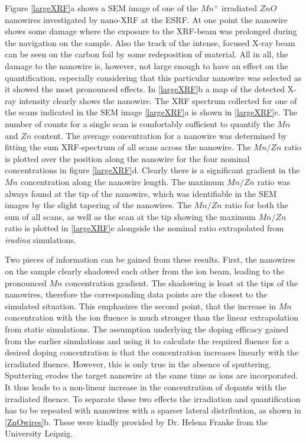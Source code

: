 Figure \ref{largeXRF}a shows a SEM image of one of the $Mn^+$ irradiated $ZnO$ nanowires investigated by nano-XRF at the ESRF. At one point the nanowire shows some damage where the exposure to the XRF-beam was prolonged during the navigation on the sample. Also the track of the intense, focused X-ray beam can be seen on the carbon foil by some redeposition of material. All in all, the damage to the nanowire is, however, not large enough to have an effect on the quantification, especially considering that this particular nanowire was selected as it showed the most pronounced effects. In \ref{largeXRF}b a map of the detected X-ray intensity clearly shows the nanowire. The XRF spectrum collected for one of the scans indicated in the SEM image \ref{largeXRF}a is shown in \ref{largeXRF}c. The number of counts for a single scan is comfortably sufficient to quantify the $Mn$ and $Zn$ content. The average concentration for a nanowire was determined by fitting the sum XRF-spectrum of all scans across the nanowire. The $Mn/Zn$ ratio is plotted over the position along the nanowire for the four nominal concentrations in figure \ref{largeXRF}d. Clearly there is a significant gradient in the $Mn$ concentration along the nanowire length. The maximum $Mn/Zn$ ratio was always found at the tip of the nanowire, which was identifiable in the SEM images by the slight tapering of the nanowires. The $Mn/Zn$ ratio for both the sum of all scans, as well as the scan at the tip showing the maximum $Mn/Zn$ ratio is plotted in \ref{largeXRF}e alongside the nominal ratio extrapolated from \emph{iradina} simulations.
  
Two pieces of information can be gained from these results. First, the nanowires on the sample clearly shadowed each other from the ion beam, leading to the pronounced $Mn$ concentration gradient. The shadowing is least at the tips of the nanowires, therefore the corresponding data points are the closest to the simulated situation. This emphasizes the second point, that the increase in $Mn$ concentration with the ion fluence is much stronger than the linear extrapolation from static simulations. The assumption underlying the doping efficacy gained from the earlier simulations and using it to calculate the required fluence for a desired doping concentration is that the concentration increases linearly with the irradiated fluence. However, this is only true in the absence of sputtering. Sputtering erodes the target nanowire at the same time as ions are incorporated. It thus leads to a non-linear increase in the concentration of dopants with the irradiated fluence. To separate these two effects the irradiation and quantification has to be repeated with nanowires with a sparser lateral distribution, as shown in \ref{ZnOwires}b. These were kindly provided by Dr. Helena Franke from the University Leipzig.

